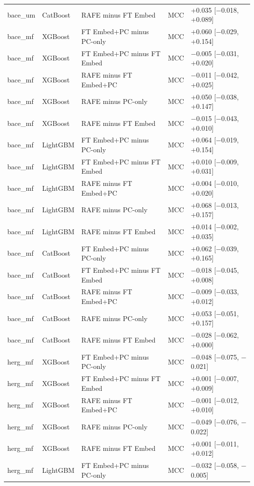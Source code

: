 \begin{longtable}{llllp{4.2cm}}
bace\_um & CatBoost & RAFE minus FT Embed & MCC & +0.035 [$-$0.018, +0.089] \\
bace\_mf & XGBoost & FT Embed+PC minus PC-only & MCC & +0.060 [$-$0.029, +0.154] \\
bace\_mf & XGBoost & FT Embed+PC minus FT Embed & MCC & $-$0.005 [$-$0.031, +0.020] \\
bace\_mf & XGBoost & RAFE minus FT Embed+PC & MCC & $-$0.011 [$-$0.042, +0.025] \\
bace\_mf & XGBoost & RAFE minus PC-only & MCC & +0.050 [$-$0.038, +0.147] \\
bace\_mf & XGBoost & RAFE minus FT Embed & MCC & $-$0.015 [$-$0.043, +0.010] \\
bace\_mf & LightGBM & FT Embed+PC minus PC-only & MCC & +0.064 [$-$0.019, +0.154] \\
bace\_mf & LightGBM & FT Embed+PC minus FT Embed & MCC & +0.010 [$-$0.009, +0.031] \\
bace\_mf & LightGBM & RAFE minus FT Embed+PC & MCC & +0.004 [$-$0.010, +0.020] \\
bace\_mf & LightGBM & RAFE minus PC-only & MCC & +0.068 [$-$0.013, +0.157] \\
bace\_mf & LightGBM & RAFE minus FT Embed & MCC & +0.014 [$-$0.002, +0.035] \\
bace\_mf & CatBoost & FT Embed+PC minus PC-only & MCC & +0.062 [$-$0.039, +0.165] \\
bace\_mf & CatBoost & FT Embed+PC minus FT Embed & MCC & $-$0.018 [$-$0.045, +0.008] \\
bace\_mf & CatBoost & RAFE minus FT Embed+PC & MCC & $-$0.009 [$-$0.033, +0.012] \\
bace\_mf & CatBoost & RAFE minus PC-only & MCC & +0.053 [$-$0.051, +0.157] \\
bace\_mf & CatBoost & RAFE minus FT Embed & MCC & $-$0.028 [$-$0.062, +0.000] \\
herg\_mf & XGBoost & FT Embed+PC minus PC-only & MCC & $-$0.048 [$-$0.075, $-$0.021] \\
herg\_mf & XGBoost & FT Embed+PC minus FT Embed & MCC & +0.001 [$-$0.007, +0.009] \\
herg\_mf & XGBoost & RAFE minus FT Embed+PC & MCC & $-$0.001 [$-$0.012, +0.010] \\
herg\_mf & XGBoost & RAFE minus PC-only & MCC & $-$0.049 [$-$0.076, $-$0.022] \\
herg\_mf & XGBoost & RAFE minus FT Embed & MCC & +0.001 [$-$0.011, +0.012] \\
herg\_mf & LightGBM & FT Embed+PC minus PC-only & MCC & $-$0.032 [$-$0.058, $-$0.005] \\

\end{longtable}
